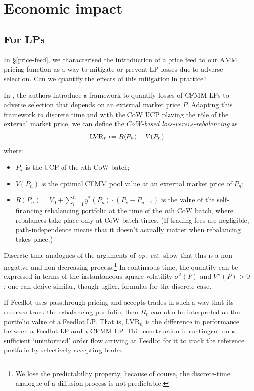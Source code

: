 \documentclass[a4paper,10pt]{article}
\theoremstyle{remark}
\newcommand{\defeq}{\mathrel{\vcenter{\hbox{\scriptsize:}}\!=}} %
\begin{document}
\section{Economic impact}
\label{impact}

\subsection{For LPs}
In \S\ref{price-feed}, we characterised the introduction of a price feed to our AMM pricing function as a way to mitigate or prevent LP losses due to adverse selection.
%
Can we quantify the effects of this mitigation in practice?

In \cite{milionis2022automated}, the authors introduce a framework to quantify losses of CFMM LPs to adverse selection that depends on an external market price $P$.
%
Adapting this framework to discrete time and with the CoW UCP playing the r\^ole of the external market price, we can define the \emph{CoW-based loss-versus-rebalancing} as
\[
  \mathrm{LVR}_n \defeq R(P_n) - V(P_n)
\]
where:
\begin{itemize}
  \item $P_n$ is the UCP of the $n$th CoW batch;
  \item $V(P_n)$ is the optimal CFMM pool value at an external market price of $P_n$;
  \item 
    $R(P_n) = V_0 + \sum_{i=1}^n y^*(P_n)\cdot (P_n-P_{n-1})$ is the value of the self-financing rebalancing portfolio at the time of the $n$th CoW batch, where rebalances take place only at CoW batch times.
    (If trading fees are negligible, path-independence means that it doesn't actually matter when rebalancing takes place.)
    
\end{itemize}
Discrete-time analogues of the arguments of \emph{op.~cit}.~show that this is a non-negative and non-decreasing process.\footnote{We lose the predictability property, because of course, the discrete-time analogue of a diffusion process is not predictable.} 
%
In continuous time, the quantity can be expressed in terms of the instantaneous square volatility $\sigma^2(P)$ and $V''(P)>0$; one can derive similar, though uglier, formulas for the discrete case.

If Feedlot uses passthrough pricing and accepts trades in such a way that its reserves track the rebalancing portfolio, then $R_n$ can also be interpreted as the portfolio value of a Feedlot LP.
%
That is, $\mathrm{LVR}_n$ is the difference in performance between a Feedlot LP and a CFMM LP.
%
This construction is contingent on a sufficient `uninformed' order flow arriving at Feedlot for it to track the reference portfolio by selectively accepting trades.
%
\end{document}
